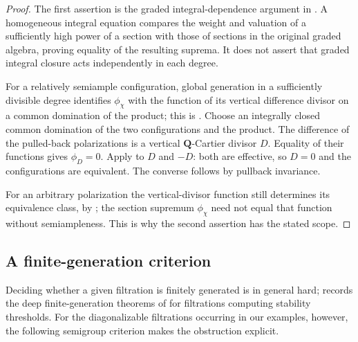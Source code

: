 \begin{proof}
The first assertion is the graded integral-dependence argument in
.  A homogeneous integral equation compares
the weight and valuation of a sufficiently high power of a section with
those of sections in the original graded algebra, proving equality of
the resulting suprema.  It does not assert that graded integral closure
acts independently in each degree.

For a relatively semiample configuration, global generation in a
sufficiently divisible degree identifies $\phi_\chi$ with the function
of its vertical difference divisor on a common domination of the
product; this is \cite[Theorem~2.31(ii), proof]{BJ22}.
Choose an integrally closed common domination of the two configurations
and the product.  The difference of the pulled-back polarizations is
a vertical $\mathbf Q$-Cartier divisor $D$.  Equality of their functions
gives $\phi_D=0$.  Apply  to $D$ and $-D$:
both are effective, so $D=0$ and the configurations are equivalent.
The converse follows by pullback invariance.

For an arbitrary polarization the vertical-divisor function still
determines its equivalence class, by \cite[Theorem~2.31(i)]{BJ22};
the section supremum $\phi_\chi$ need not equal that function without
semiampleness.  This is why the second assertion has the stated scope.
\end{proof}

\subsection{A finite-generation criterion}
\label{sec:ch33-fg-criterion}

Deciding whether a given filtration is finitely generated is in general
hard;  records the deep finite-generation theorems
of \cite{LXZ22} for filtrations computing stability thresholds.  For the
diagonalizable filtrations occurring in our examples, however, the following
semigroup criterion makes the obstruction explicit.

